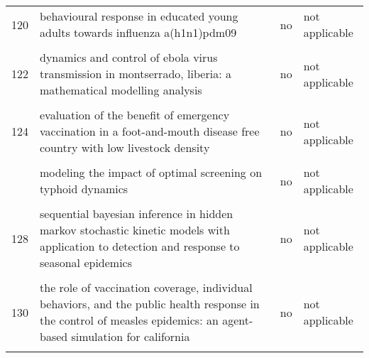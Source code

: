 \documentclass[
]{article}
\begin{document}
\begin{landscape}
\begin{longtable}{l>{\raggedright\arraybackslash}p{4cm}l>{\raggedright\arraybackslash}p{4cm}}
120 & behavioural response in educated young adults towards influenza a(h1n1)pdm09 & no & not applicable\\
\addlinespace
\cellcolor{gray!6}{121} & \cellcolor{gray!6}{cover your cough! quantifying the benefits of a localized healthy behavior intervention on flu epidemics in washington dc} & \cellcolor{gray!6}{yes} & \cellcolor{gray!6}{yes}\\
122 & dynamics and control of ebola virus transmission in montserrado, liberia: a mathematical modelling analysis & no & not applicable\\
\cellcolor{gray!6}{123} & \cellcolor{gray!6}{estimating the effectiveness of early control measures through school absenteeism surveillance in observed outbreaks at rural schools in hubei, china} & \cellcolor{gray!6}{no} & \cellcolor{gray!6}{not applicable}\\
124 & evaluation of the benefit of emergency vaccination in a foot-and-mouth disease free country with low livestock density & no & not applicable\\
\cellcolor{gray!6}{125} & \cellcolor{gray!6}{modeling the dynamics of oral poliovirus vaccine cessation} & \cellcolor{gray!6}{no} & \cellcolor{gray!6}{not applicable}\\
\addlinespace
126 & modeling the impact of optimal screening on typhoid dynamics & no & not applicable\\
\cellcolor{gray!6}{127} & \cellcolor{gray!6}{modeling the influence of environment and intervention oncholera in haiti} & \cellcolor{gray!6}{no} & \cellcolor{gray!6}{not applicable}\\
128 & sequential bayesian inference in hidden markov stochastic kinetic models with application to detection and response to seasonal epidemics & no & not applicable\\
\cellcolor{gray!6}{129} & \cellcolor{gray!6}{simulating optimal vaccination times during cholera outbreaks} & \cellcolor{gray!6}{no} & \cellcolor{gray!6}{not applicable}\\
130 & the role of vaccination coverage, individual behaviors, and the public health response in the control of measles epidemics: an agent-based simulation for california & no & not applicable\\
\addlinespace
\cellcolor{gray!6}{131} & \cellcolor{gray!6}{time is (still) of the essence: quantifying the impact of emergency meningitis vaccination response in katsina state, nigeria} & \cellcolor{gray!6}{no} & \cellcolor{gray!6}{not applicable}\\

\end{longtable}
\end{landscape}
\end{document}
